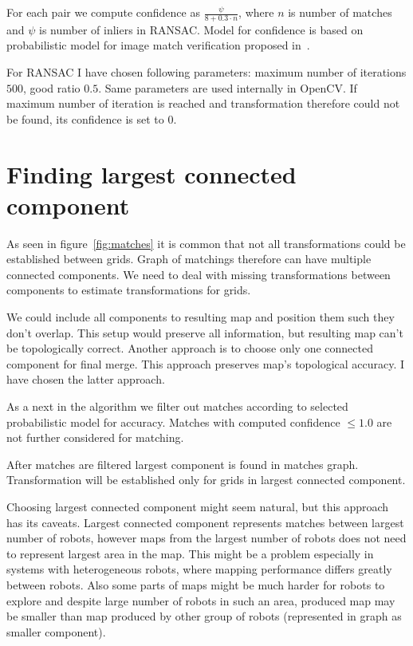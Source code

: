For each pair we compute confidence as $\frac{\psi}{8 + 0.3 \cdot n}$, where $n$ is number of matches and $\psi$ is number of inliers in \gls{RANSAC}. Model for confidence is based on probabilistic model for image match verification proposed in~\cite{Brown2006}.

For \gls{RANSAC} I have chosen following parameters: maximum number of iterations $500$, good ratio $0.5$. Same parameters are used internally in \gls{OpenCV}. If maximum number of iteration is reached and transformation therefore could not be found, its confidence is set to $0$.


\section{Finding largest connected component} %
\label{sec:findinglargestconnectedcomponent}

As seen in figure~\ref{fig:matches} it is common that not all transformations could be established between grids. Graph of matchings therefore can have multiple connected components. We need to deal with missing transformations between components to estimate transformations for grids.

We could include all components to resulting map and position them such they don't overlap. This setup would preserve all information, but resulting map can't be topologically correct. Another approach is to choose only one connected component for final merge. This approach preserves map's topological accuracy. I have chosen the latter approach.

As a next in the algorithm we filter out matches according to selected probabilistic model for accuracy. Matches with computed confidence $\le 1.0$ are not further considered for matching.

After matches are filtered largest component is found in matches graph. Transformation will be established only for grids in largest connected component.

Choosing largest connected component might seem natural, but this approach has its caveats. Largest connected component represents matches between largest number of robots, however maps from the largest number of robots does not need to represent largest area in the map. This might be a problem especially in systems with heterogeneous robots, where mapping performance differs greatly between robots. Also some parts of maps might be much harder for robots to explore and despite large number of robots in such an area, produced map may be smaller than map produced by other group of robots (represented in graph as smaller component).

